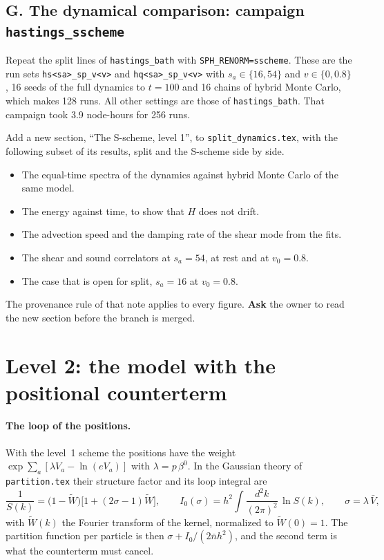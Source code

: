 \documentclass[11pt,aps,preprint,nofootinbib,superscriptaddress,tightenlines]{revtex4-2}
\def\st{\begin{equation}}
\def\stp{\end{equation}}
\let\oldparagraph\paragraph
\renewcommand{\paragraph}{\par\bigskip\oldparagraph}
\begin{document}
\subsection{G. The dynamical comparison: campaign \texttt{hastings\_sscheme}}

Repeat the split lines of \texttt{hastings\_bath} with \texttt{SPH\_RENORM=sscheme}.  These are the run sets \texttt{hs<sa>\_sp\_v<v>} and
\texttt{hq<sa>\_sp\_v<v>} with $s_a\in\{16,54\}$ and $v\in\{0,0.8\}$, 16 seeds of the full dynamics to $t=100$ and 16 chains of hybrid Monte Carlo,
which makes 128 runs.  All other settings are those of \texttt{hastings\_bath}.  That campaign took 3.9 node-hours for 256 runs.

Add a new section, ``The S-scheme, level 1'', to \nolinkurl{split_dynamics.tex}, with the following subset of its results, split and the S-scheme side by
side.
\begin{itemize}
\item The equal-time spectra of the dynamics against hybrid Monte Carlo of the same model.
\item The energy against time, to show that $H$ does not drift.
\item The advection speed and the damping rate of the shear mode from the fits.
\item The shear and sound correlators at $s_a=54$, at rest and at $v_0=0.8$.
\item The case that is open for split, $s_a=16$ at $v_0=0.8$.
\end{itemize}
The provenance rule of that note applies to every figure.  \textbf{Ask} the owner to read the new section before the branch is merged.

\section{Level 2: the model with the positional counterterm}
\label{sec:model2}

\paragraph{The loop of the positions.}  With the level~1 scheme the positions have the weight $\exp\sum_a[\lambda V_a-\ln(eV_a)]$ with
$\lambda=p\,\beta^0$.  In the Gaussian theory of \nolinkurl{partition.tex} their structure factor and its loop integral are
\st
\frac1{S(k)}=\big(1-\widetilde W\big)\big[1+(2\sigma-1)\widetilde W\big],\qquad
I_0(\sigma)=h^2\!\int\!\frac{d^2k}{(2\pi)^2}\,\ln S(k),\qquad \sigma=\lambda\,\bar V ,
\label{I0}
\stp
with $\widetilde W(k)$ the Fourier transform of the kernel, normalized to $\widetilde W(0)=1$.  The partition function per particle is then
$\sigma+I_0/(2\bar nh^2)$, and the second term is what the counterterm must cancel.
\end{document}
